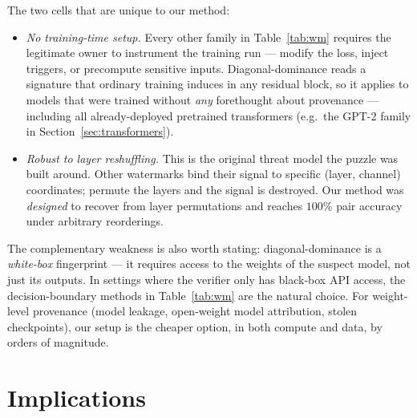 \documentclass[10pt]{article}
\theoremstyle{remark}
\begin{document}
The two cells that are unique to our method:
\begin{itemize}[leftmargin=*,itemsep=0pt]
  \item \emph{No training-time setup.} Every other family in
        Table~\ref{tab:wm} requires the legitimate owner to instrument
        the training run --- modify the loss, inject triggers, or
        precompute sensitive inputs. Diagonal-dominance reads a
        signature that ordinary training induces in any residual
        block, so it applies to models that were trained without
        \emph{any} forethought about provenance --- including all
        already-deployed pretrained transformers (e.g.\ the GPT-2
        family in Section~\ref{sec:transformers}).
  \item \emph{Robust to layer reshuffling.} This is the original
        threat model the puzzle was built around. Other watermarks
        bind their signal to specific (layer, channel) coordinates;
        permute the layers and the signal is destroyed. Our method
        was \emph{designed} to recover from layer permutations and
        reaches $100\%$ pair accuracy under arbitrary reorderings.
\end{itemize}

The complementary weakness is also worth stating: diagonal-dominance
is a \emph{white-box} fingerprint --- it requires access to the
weights of the suspect model, not just its outputs. In settings where
the verifier only has black-box API access, the decision-boundary
methods in Table~\ref{tab:wm} are the natural choice. For weight-level
provenance (model leakage, open-weight model attribution, stolen
checkpoints), our setup is the cheaper option, in both compute and
data, by orders of magnitude.

\section{Implications}
\end{document}
